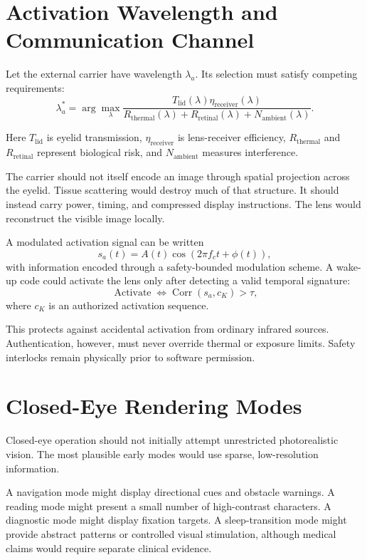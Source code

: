 \documentclass[11pt]{article}
\begin{document}
\section{Activation Wavelength and Communication Channel}

Let the external carrier have wavelength $\lambda_a$. Its selection must satisfy competing requirements:
\[
\lambda_a^\ast=\arg\max_\lambda\frac{T_{\mathrm{lid}}(\lambda)\eta_{\mathrm{receiver}}(\lambda)}{R_{\mathrm{thermal}}(\lambda)+R_{\mathrm{retinal}}(\lambda)+N_{\mathrm{ambient}}(\lambda)}.
\]

Here $T_{\mathrm{lid}}$ is eyelid transmission, $\eta_{\mathrm{receiver}}$ is lens-receiver efficiency, $R_{\mathrm{thermal}}$ and $R_{\mathrm{retinal}}$ represent biological risk, and $N_{\mathrm{ambient}}$ measures interference.

The carrier should not itself encode an image through spatial projection across the eyelid. Tissue scattering would destroy much of that structure. It should instead carry power, timing, and compressed display instructions. The lens would reconstruct the visible image locally.

A modulated activation signal can be written
\[
s_a(t)=A(t)\cos(2\pi f_c t+\phi(t)),
\]
with information encoded through a safety-bounded modulation scheme. A wake-up code could activate the lens only after detecting a valid temporal signature:
\[
\operatorname{Activate}\iff\operatorname{Corr}(s_a,c_K)>\tau,
\]
where $c_K$ is an authorized activation sequence.

This protects against accidental activation from ordinary infrared sources. Authentication, however, must never override thermal or exposure limits. Safety interlocks remain physically prior to software permission.

\section{Closed-Eye Rendering Modes}

Closed-eye operation should not initially attempt unrestricted photorealistic vision. The most plausible early modes would use sparse, low-resolution information.

A navigation mode might display directional cues and obstacle warnings. A reading mode might present a small number of high-contrast characters. A diagnostic mode might display fixation targets. A sleep-transition mode might provide abstract patterns or controlled visual stimulation, although medical claims would require separate clinical evidence.
\end{document}
